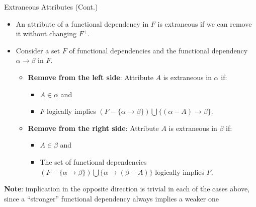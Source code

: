 \documentclass{beamer}
\begin{document}
\begin{frame}{Extraneous Attributes (Cont.)}
    \begin{itemize}
        \item An attribute of a functional dependency in $F$ is extraneous if we can remove it without changing $F^+$.
        \item Consider a set $F$ of functional dependencies and the functional dependency $\alpha \rightarrow \beta$ in $F$.
            \begin{itemize}
                \item \textbf{Remove from the left side}: Attribute $A$ is extraneous in $\alpha$ if:
                    \begin{itemize}
                        \item $A \in \alpha$ and
                        \item $F$ logically implies $(F - \{ \alpha \rightarrow \beta \}) \bigcup \{(\alpha - A) \rightarrow \beta \}$.
                    \end{itemize}
                \item \textbf{Remove from the right side}: Attribute $A$ is extraneous in $\beta$ if:
                    \begin{itemize}
                        \item $A \in \beta$ and
                        \item The set of functional dependencies $(F - \{ \alpha \rightarrow \beta \}) \bigcup \{ \alpha \rightarrow (\beta - A) \}$ logically implies $F$.
                    \end{itemize}
            \end{itemize}
    \end{itemize}
    \textbf{Note}: implication in the opposite direction is trivial in each of the cases above, since a ``stronger'' functional dependency always implies a weaker one
\end{frame}
\end{document}
